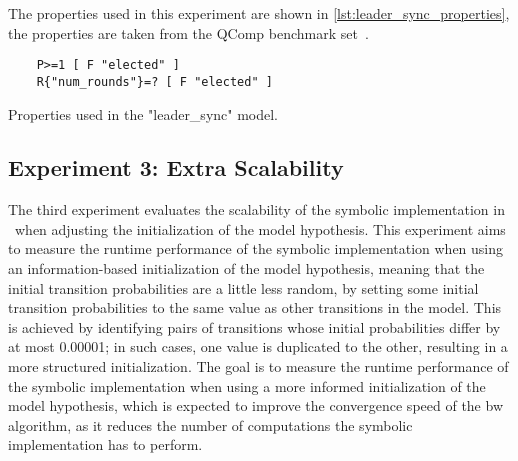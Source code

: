 The properties used in this experiment are shown in \autoref{lst:leader_sync_properties}, the properties are taken from the QComp benchmark set~\cite{hartmanns2019quantitative}.
\begin{listing}
    \begin{verbatim}
    P>=1 [ F "elected" ]
    R{"num_rounds"}=? [ F "elected" ]
    \end{verbatim}
    \caption{Properties used in the "leader\_sync" model.}
    \label{lst:leader_sync_properties}
\end{listing}

\subsection{Experiment 3: Extra Scalability}\label{sec:exp_extra_scalability}
The third experiment evaluates the scalability of the symbolic implementation in \JajapyTwo\ when adjusting the initialization of the model hypothesis.
This experiment aims to measure the runtime performance of the symbolic implementation when using an information-based initialization of the model hypothesis, meaning that the initial transition probabilities are a little less random, by setting some initial transition probabilities to the same value as other transitions in the model.
This is achieved by identifying pairs of transitions whose initial probabilities differ by at most 0.00001; in such cases, one value is duplicated to the other, resulting in a more structured initialization.
The goal is to measure the runtime performance of the symbolic implementation when using a more informed initialization of the model hypothesis, which is expected to improve the convergence speed of the \gls{bw} algorithm, as it reduces the number of computations the symbolic implementation has to perform.


